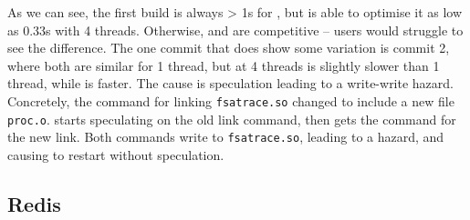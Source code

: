 

As we can see, the first build is always > 1s for \Rattle, but \Make is able to optimise it as low as 0.33s with 4 threads. Otherwise, \Rattle and \Make are competitive -- users would struggle to see the difference. The one commit that does show some variation is commit 2, where both are similar for 1 thread, but \Rattle at 4 threads is slightly slower than 1 thread, while \Make is faster. The cause is speculation leading to a write-write hazard. Concretely, the command for linking \texttt{fsatrace.so} changed to include a new file \texttt{proc.o}. \Rattle starts speculating on the old link command, then gets the command for the new link. Both commands write to \texttt{fsatrace.so}, leading to a hazard, and causing \Rattle to restart without speculation.


\subsection{Redis}
\label{sec:eval:redis}

